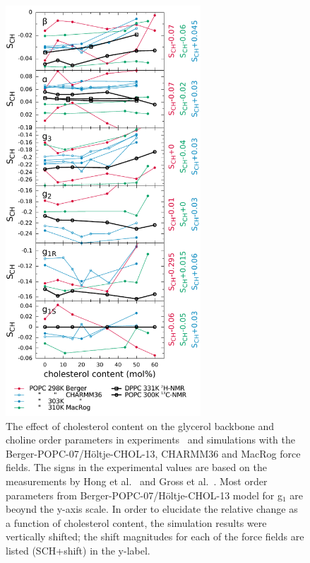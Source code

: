 \documentclass[journal=jacsat,manuscript=article]{achemso}
\begin{document}
\begin{figure}[]
  \centering
  \includegraphics[width=7.3cm]{../DATAreportediINblog/cholesterolization_lp.pdf}
  \caption{\label{ordPchol}
    The effect of cholesterol content on the glycerol backbone and choline order parameters in experiments~\cite{brown78,ferreira13} and simulations
    with the Berger-POPC-07/H\"oltje-CHOL-13, CHARMM36 and MacRog force fields. The signs in the experimental values are based on the measurements by Hong et al.~\cite{hong95a,hong95b} 
    and Gross et al.~\cite{gross97}.  Most order parameters from Berger-POPC-07/H\"oltje-CHOL-13 model for g$_1$ are beoynd the y-axis scale.
    In order to elucidate the relative change as a function of cholesterol content, the simulation results were vertically shifted; 
    the shift magnitudes for each of the force fields are listed (SCH+shift) in the y-label.
}
\end{figure}
\end{document}
